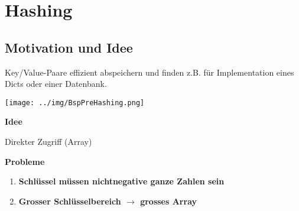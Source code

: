 \documentclass[german]{latex4ei/latex4ei_sheet}
\begin{document}
\vspace{105px}
\section{Hashing}

\begin{sectionbox}
\subsection{Motivation und Idee}\smallskip
Key/Value-Paare effizient abspeichern und finden z.B. für Implementation eines Dicts oder einer Datenbank.\par\smallskip

\begin{center}
    \texttt{[image: ../img/BspPreHashing.png]}
\end{center}\smallskip

\textbf{Idee}\par
Direkter Zugriff (Array)\par\smallskip
\begin{greenbox}
\textbf{Probleme}\par
\begin{enumerate}
    \item \textbf{Schlüssel müssen nichtnegative ganze Zahlen sein}
    \item \textbf{Grosser Schlüsselbereich $\rightarrow$ grosses Array}
\end{enumerate}
\end{greenbox}
\end{sectionbox}
\end{document}

